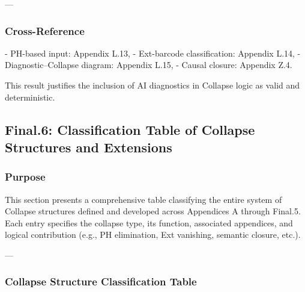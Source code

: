 \documentclass[11pt]{article}
\begin{document}
\begin{axiom}
\begin{axiom}
{{---

\subsubsection*{Cross-Reference}

- PH-based input: Appendix L.13,
- Ext-barcode classification: Appendix L.14,
- Diagnostic–Collapse diagram: Appendix L.15,
- Causal closure: Appendix Z.4.

This result justifies the inclusion of AI diagnostics in Collapse logic as valid and deterministic.


\subsection*{Final.6: Classification Table of Collapse Structures and Extensions}

\subsubsection*{Purpose}

This section presents a comprehensive table classifying  
the entire system of Collapse structures defined and developed  
across Appendices A through Final.5.  
Each entry specifies the collapse type, its function, associated appendices,  
and logical contribution (e.g., PH elimination, Ext vanishing, semantic closure, etc.).

---

\subsubsection*{Collapse Structure Classification Table}

}}
\end{axiom}
\end{axiom}
\end{document}

